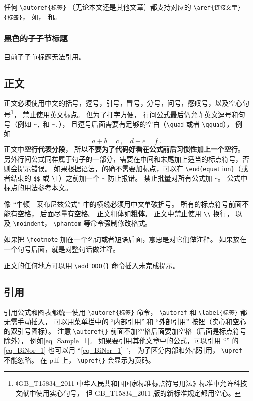 任何 \verb`\autoref{标签}` （无论本文还是其他文章）都支持对应的 \verb`\aref{链接文字}{标签}`， 如， 和。


\subsubsection{黑色的子子节标题}
目前子子节标题无法引用。

\subsection{正文}\label{sub_Sample_16}
正文必须使用中文的括号，逗号，引号，冒号，分号，问号，感叹号，以及空心句号\footnote{《GB\_T15834\_2011 中华人民共和国国家标准标点符号用法》标准中允许科技文献中使用实心句号， 但 GB\_T15834\_2011 版的新标准规定都用空心。}， 禁止使用英文标点。 但为了打字方便， 行间公式最后仍允许英文逗号和句号（例如 \verb|~,| 和 \verb|~.|）， 且逗号后面需要有足够的空白（\verb|\quad| 或者 \verb|\qquad|）， 例如
\begin{equation}\label{eq_Sample_2}
a + b = c~, \quad d + e = f~.
\end{equation}
正文中\textbf{空行代表分段}， 所以\textbf{不要为了代码好看在公式前后习惯性加上一个空行}。 另外行间公式同样属于句子的一部分，需要在中间和末尾加上适当的标点符号，否则会提示错误。 如果根据语法，的确不需要加标点，可以在 \verb|\end{equation}|（或者结束的 \verb`$$` 或 \verb`\]`）之前加一个 \verb|~| 防止报错。 禁止批量对所有公式加 \verb|~|。 公式中标点的用法参考本文。

像 “牛顿—莱布尼兹公式” 中的横线必须用中文单破折号。 所有的标点符号前面不能有空格， 后面尽量有空格。 正文粗体如\textbf{粗体}。 正文中禁止使用 \verb|\\| 换行， 以及 \verb|\noindent|， \verb|\phantom| 等命令强制修改格式。

如果把 \verb|\footnote| 加在一个名词或者短语后面，意思是对它们做注释。 如果放在一个句号后面，就是对整句话做注释。

正文的任何地方可以用 \verb|\addTODO{}| 命令插入未完成提示。

\subsection{引用}
引用公式和图表都统一使用 \verb|\autoref{标签}| 命令， \verb|\autoref| 和 \verb|\label{标签}| 都无需手动插入， 可以用菜单栏中的 “内部引用” 和 “外部引用” 按钮（实心和空心的双引号图标）。 注意 \verb|\autoref{}| 前面不加空格后面要加空格（后面是标点符号除外）， 例如\autoref{eq_Sample_1}。 如果要引用其他文章中的公式，可以引用 “” 的\autoref{eq_BiNor_1} 也可以用 “\autoref{eq_BiNor_1} ”， 为了区分内部和外部引用， \verb|\upref| 不能忽略。 在 pdf 上， \verb|\upref{}| 会显示为页码。

